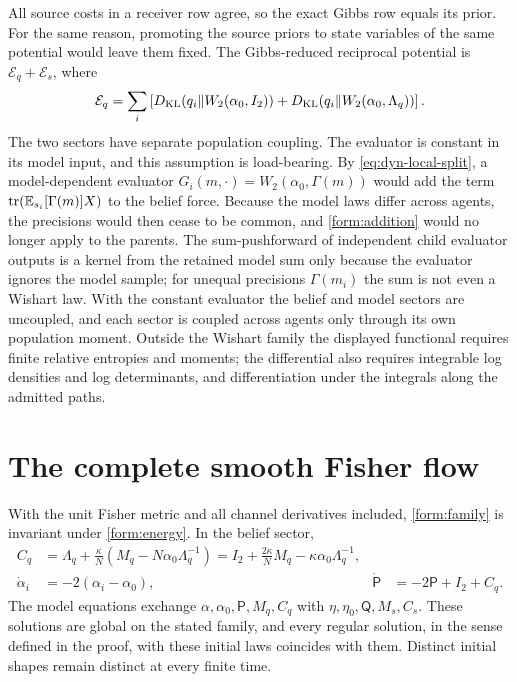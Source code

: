 All source costs in a receiver row agree, so the exact Gibbs row equals its
prior. For the same reason, promoting the source priors to state variables of the same potential would leave them fixed. The Gibbs-reduced reciprocal potential is $\mathcal E_q+\mathcal E_s$,
where
\begin{equation}
 \mathcal E_q=\sum_i\left[
 D_{\mathrm{KL}}(q_i\Vert W_2(\alpha_0,I_2))
 +D_{\mathrm{KL}}(q_i\Vert W_2(\alpha_0,\Lambda_q))\right].
 \label{form:energy}
\end{equation}
The two sectors have separate population coupling. The evaluator is constant in its model input, and this assumption is load-bearing. By \cref{eq:dyn-local-split}, a model-dependent evaluator $G_i(m,\cdot)=W_2(\alpha_0,\Gamma(m))$ would add the term $\operatorname{tr}(\mathbb E_{s_i}[\Gamma(m)]X)$ to the belief force. Because the model laws differ across agents, the precisions would then cease to be common, and \cref{form:addition} would no longer apply to the parents. The sum-pushforward of independent child evaluator outputs is a kernel from the retained model sum only because the evaluator ignores the model sample; for unequal precisions $\Gamma(m_i)$ the sum is not even a Wishart law. With the constant evaluator the belief and model sectors are uncoupled, and each sector is coupled across agents only through its own population moment.
Outside the Wishart family the displayed
functional requires finite relative entropies and moments; the differential
also requires integrable log densities and log determinants, and differentiation
under the integrals along the admitted paths.

\section{The complete smooth Fisher flow}

With the unit Fisher metric and all channel derivatives included,
\cref{form:family} is invariant under \cref{form:energy}. In the belief sector,
\begin{align}
 C_q&=\Lambda_q+\frac{\kappa}{N}
              (M_q-N\alpha_0\Lambda_q^{-1})
       =I_2+\frac{2\kappa}{N}M_q-\kappa\alpha_0\Lambda_q^{-1},
       \label{form:complete-force}\\
 \dot\alpha_i&=-2(\alpha_i-\alpha_0),&
 \dot{\mathsf P}&=-2\mathsf P+I_2+C_q.
 \label{form:ode}
\end{align}
The model equations exchange $\alpha,\alpha_0,\mathsf P,M_q,C_q$ with
$\eta,\eta_0,\mathsf Q,M_s,C_s$. These solutions are global on
the stated family, and every regular solution, in the sense defined in the proof, with these initial laws coincides with them. Distinct initial shapes remain distinct at every finite
time.

